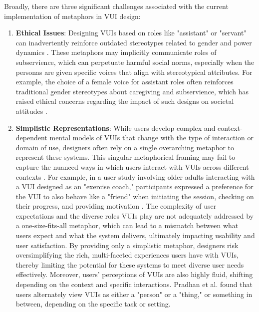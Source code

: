 Broadly, there are three significant challenges associated with the current implementation of metaphors in VUI design:
\begin{enumerate}

\item \textbf{Ethical Issues}: Designing VUIs based on roles like "assistant" or "servant" can inadvertently reinforce outdated stereotypes related to gender and power dynamics \cite{McMillan_Jaber_2021, Pradhan_Lazar_2021}. These metaphors may implicitly communicate roles of subservience, which can perpetuate harmful social norms, especially when the personas are given specific voices that align with stereotypical attributes. For example, the choice of a female voice for assistant roles often reinforces traditional gender stereotypes about caregiving and subservience, which has raised ethical concerns regarding the impact of such designs on societal attitudes \cite{Brahnam_Karanikas_Weaver_2011, Turk_2016, Kuzminykh_Sun_Govindaraju_Avery_Lank_2020}.

\item \textbf{Simplistic Representations}: While users develop complex and context-dependent mental models of VUIs that change with the type of interaction or domain of use, designers often rely on a single overarching metaphor to represent these systems. This singular metaphorical framing may fail to capture the nuanced ways in which users interact with VUIs across different contexts \cite{Desai_Twidale_2022}. For example, in a user study involving older adults interacting with a VUI designed as an "exercise coach," participants expressed a preference for the VUI to also behave like a "friend" when initiating the session, checking on their progress, and providing motivation \cite{Desai_Hu_Lundy_Chin_2023}. The complexity of user expectations and the diverse roles VUIs play are not adequately addressed by a one-size-fits-all metaphor, which can lead to a mismatch between what users expect and what the system delivers, ultimately impacting usability and user satisfaction. By providing only a simplistic metaphor, designers risk oversimplifying the rich, multi-faceted experiences users have with VUIs, thereby limiting the potential for these systems to meet diverse user needs effectively.  Moreover, users' perceptions of VUIs are also highly fluid, shifting depending on the context and specific interactions. Pradhan et al. \cite{Pradhan_Lazar_2021} found that users alternately view VUIs as either a "person" or a "thing," or something in between, depending on the specific task or setting. 


\end{enumerate}
